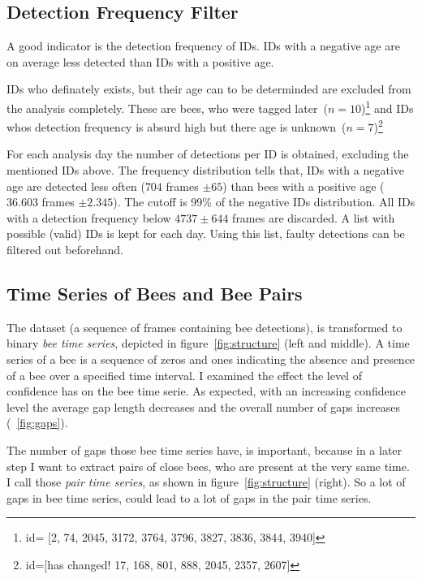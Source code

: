 \subsection{Detection Frequency Filter}
A good indicator is the detection frequency of IDs. IDs with a negative age are on average less detected than IDs with a positive age.

IDs who definately exists, but their age can to be determinded are excluded from the analysis completely. These are bees, who were tagged later~($n=10$)\footnote{id= [2,
	74,
	2045,
	3172,
	3764,
	3796,
	3827,
	3836,
	3844,
	3940]} and IDs whos detection frequency is absurd high but there age is unknown~($n=7$)\footnote{id=[has changed! 
	17,
	168,
	801,
	888,
	2045,
	2357,
	2607]}

For each analysis day the number of detections per ID is obtained, excluding the mentioned IDs above. The frequency distribution tells that, IDs with a negative age are detected less often ($704$ frames $\pm 65$)  than bees with a positive age ($36.603$ frames $\pm 2.345$). The cutoff is 99\% of the negative IDs distribution. All IDs with a detection frequency below $4737 \pm 644$ frames are discarded. A list with possible (valid) IDs is kept for each day. Using this list, faulty detections can be filtered out beforehand.



\subsection{Time Series of Bees and Bee Pairs}
\label{subsec:tracking}

The dataset (a sequence of frames containing bee detections), is transformed to binary \emph{bee time series}, depicted in figure~\ref{fig:structure} (left and middle). A time series of a bee is a sequence of zeros and ones indicating the absence and presence of a bee over a specified time interval. 
I examined the effect the level of confidence has on the bee time serie.
As expected, with an increasing confidence level the average gap length decreases and the overall number of gaps increases (~\ref{fig:gaps}).

The number of gaps those bee time series have, is important, because in a later step I want to extract pairs of close bees, who are present at the very same time. I call those \emph{pair time series}, as shown in figure~\ref{fig:structure} (right). So a lot of gaps in bee time series, could lead to a lot of gaps in the pair time series.

